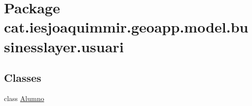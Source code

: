 \hypertarget{namespacecat_1_1iesjoaquimmir_1_1geoapp_1_1model_1_1businesslayer_1_1usuari}{}\section{Package cat.\+iesjoaquimmir.\+geoapp.\+model.\+businesslayer.\+usuari}
\label{namespacecat_1_1iesjoaquimmir_1_1geoapp_1_1model_1_1businesslayer_1_1usuari}
\subsection*{Classes}
\begin{DoxyCompactItemize}
\item 
class \mbox{\hyperlink{classcat_1_1iesjoaquimmir_1_1geoapp_1_1model_1_1businesslayer_1_1usuari_1_1_alumno}{Alumno}}
\end{DoxyCompactItemize}

